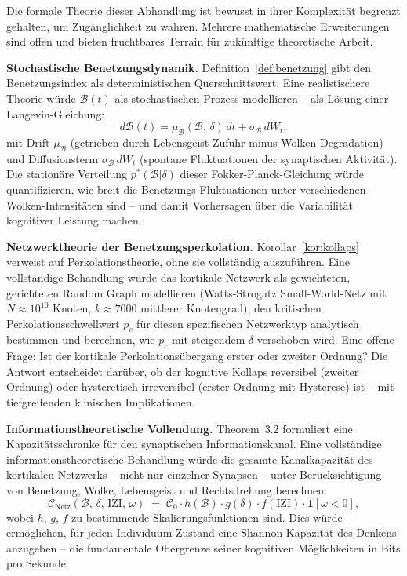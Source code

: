 ﻿\documentclass[12pt,a4paper]{report}
\theoremstyle{plain}
\theoremstyle{definition}
\theoremstyle{remark}
\begin{document}
	Die formale Theorie dieser Abhandlung ist bewusst in ihrer
	Komplexität begrenzt gehalten, um Zugänglichkeit zu wahren.
	Mehrere mathematische Erweiterungen sind offen und bieten
	fruchtbares Terrain für zukünftige theoretische Arbeit.

	\textbf{Stochastische Benetzungsdynamik.}
	Definition~\ref{def:benetzung} gibt den Benetzungsindex als
	deterministischen Querschnittswert. Eine realistischere Theorie
	würde $\mathcal{B}(t)$ als stochastischen Prozess modellieren --
	als Lösung einer Langevin-Gleichung:
	\[
	d\mathcal{B}(t)
	= \mu_{\mathcal{B}}(\mathcal{B},\,\delta)\,dt
	+ \sigma_{\mathcal{B}}\,dW_t,
	\]
	mit Drift $\mu_{\mathcal{B}}$ (getrieben durch Lebensgeist-Zufuhr minus
	Wolken-Degradation) und Diffusionsterm $\sigma_{\mathcal{B}}\,dW_t$
	(spontane Fluktuationen der synaptischen Aktivität).
	Die stationäre Verteilung $p^*(\mathcal{B}|\delta)$ dieser
	Fokker-Planck-Gleichung würde quantifizieren, wie breit die
	Benetzungs-Fluktuationen unter verschiedenen Wolken-Intensitäten sind --
	und damit Vorhersagen über die Variabilität kognitiver Leistung machen.

	\textbf{Netzwerktheorie der Benetzungsperkolation.}
	Korollar~\ref{kor:kollaps} verweist auf Perkolationstheorie,
	ohne sie vollständig auszuführen.
	Eine vollständige Behandlung würde das kortikale Netzwerk als
	gewichteten, gerichteten Random Graph modellieren
	(Watts-Strogatz Small-World-Netz mit $N \approx 10^{10}$ Knoten,
	$k \approx 7000$ mittlerer Knotengrad),
	den kritischen Perkolationsschwellwert $p_c$ für diesen
	spezifischen Netzwerktyp analytisch bestimmen
	und berechnen, wie $p_c$ mit steigendem $\delta$ verschoben wird.
	Eine offene Frage: Ist der kortikale Perkolationsübergang
	erster oder zweiter Ordnung? Die Antwort entscheidet darüber,
	ob der kognitive Kollaps reversibel (zweiter Ordnung) oder
	hysteretisch-irreversibel (erster Ordnung mit Hysterese) ist --
	mit tiefgreifenden klinischen Implikationen.

	\textbf{Informationstheoretische Vollendung.}
	Theorem~3.2 formuliert eine Kapazitätsschranke für den synaptischen
	Informationskanal. Eine vollständige informationstheoretische Behandlung
	würde die gesamte Kanalkapazität des kortikalen Netzwerks --
	nicht nur einzelner Synapsen -- unter Berücksichtigung von
	Benetzung, Wolke, Lebensgeist und Rechtsdrehung berechnen:
	\[
	\mathcal{C}_{\mathrm{Netz}}(\mathcal{B},\,\delta,\,\mathrm{IZI},\,\omega)
	\;=\; \mathcal{C}_0
	\cdot h(\mathcal{B})\cdot g(\delta)\cdot f(\mathrm{IZI})\cdot \mathbf{1}[\omega < 0],
	\]
	wobei $h$, $g$, $f$ zu bestimmende Skalierungsfunktionen sind.
	Dies würde ermöglichen, für jeden Individuum-Zustand eine
	Shannon-Kapazität des Denkens anzugeben -- die fundamentale
	Obergrenze seiner kognitiven Möglichkeiten in Bits pro Sekunde.
\end{document}
